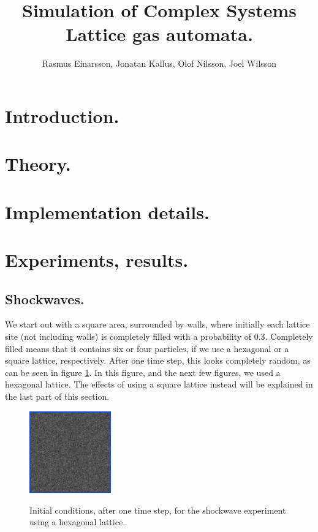 \documentclass[12pt,a4paper]{article}
\author{Rasmus Einarsson, Jonatan Kallus, Olof Nilsson, Joel Wilsson}
\title{Simulation of Complex Systems\\Lattice gas automata.}
\begin{document}
\maketitle

\section{Introduction.}

\section{Theory.}

\section{Implementation details.}

\section{Experiments, results.}
\subsection{Shockwaves.}
We start out with a square area, surrounded by walls, where initially each lattice site (not including walls)
is completely filled with a probability of 0.3. Completely filled means that it contains six or
four particles, if we use a hexagonal or a square lattice, respectively. After one time step,
this looks completely random, as can be seen in figure \ref{hexwaveinit}. In this figure, and the
next few figures, we used a hexagonal lattice. The effects of using a square lattice instead will be
explained in the last part of this section.

\begin{figure}[htp]
\caption{Initial conditions, after one time step, for the shockwave experiment using a hexagonal lattice.}
\centering
  \includegraphics[width=100pt]{figs/hexwaveinit.png}
\label{hexwaveinit}
\end{figure}
\end{document}
